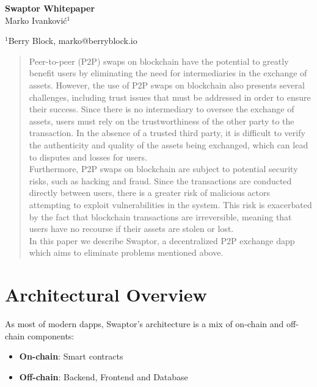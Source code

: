 \documentclass[12pt]{article}
\begin{document}
\baselineskip 12pt

\pagestyle{fancy}
\fancyhf{}

\begin{center}
  \textbf{\Large Swaptor Whitepaper} \\

  \vspace{1.5cc}
  { \sc Marko Ivanković$^{1}$}\\

  \vspace{0.3 cm}

  {\small $^{1}$Berry Block, marko@berryblock.io}
\end{center}
\vspace{1.5cc}

\begin{abstract}
  \noindent  Peer-to-peer (P2P) swaps on blockchain have the potential to greatly benefit users by eliminating the need for intermediaries in the exchange of assets. However, the use of P2P swaps on blockchain also presents several challenges, including trust issues that must be addressed in order to ensure their success.  Since there is no intermediary to oversee the exchange of assets, users must rely on the trustworthiness of the other party to the transaction. In the absence of a trusted third party, it is difficult to verify the authenticity and quality of the assets being exchanged, which can lead to disputes and losses for users.
  \\ \indent Furthermore, P2P swaps on blockchain are subject to potential security risks, such as hacking and fraud. Since the transactions are conducted directly between users, there is a greater risk of malicious actors attempting to exploit vulnerabilities in the system. This risk is exacerbated by the fact that blockchain transactions are irreversible, meaning that users have no recourse if their assets are stolen or lost.
  \\ \indent In this paper we describe Swaptor, a decentralized P2P exchange dapp which aims to eliminate problems mentioned above.

  \vspace{0.95cc}
\end{abstract}

\newpage

\tableofcontents

\newpage

\section{Architectural Overview} \label{form}
\indent As most of modern dapps, Swaptor's architecture is a mix of on-chain and off-chain components:
\begin{itemize}
  \item \textbf{On-chain}: Smart contracts
  \item \textbf{Off-chain}: Backend, Frontend and Database
\end{itemize}
\end{document}
